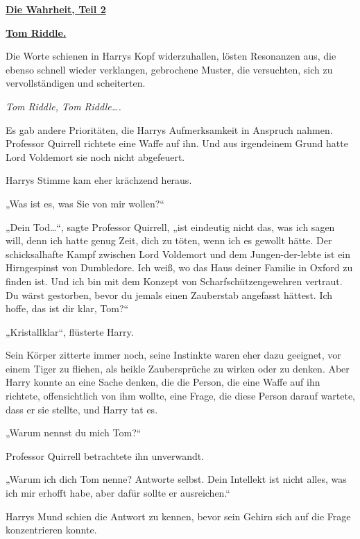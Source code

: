 

\hypertarget{die-wahrheit-teil-2}{%

\textbf{\uline{Die Wahrheit, Teil 2}}

\textbf{\uline{Tom Riddle.}}

Die Worte schienen in Harrys Kopf widerzuhallen, lösten Resonanzen aus, die ebenso schnell wieder verklangen, gebrochene Muster, die versuchten, sich zu vervollständigen und scheiterten.

\emph{Tom Riddle, Tom Riddle….}

Es gab andere Prioritäten, die Harrys Aufmerksamkeit in Anspruch nahmen. Professor Quirrell richtete eine Waffe auf ihn. Und aus irgendeinem Grund hatte Lord Voldemort sie noch nicht abgefeuert.

Harrys Stimme kam eher krächzend heraus.

„Was ist es, was Sie von mir wollen?“

„Dein Tod…“, sagte Professor Quirrell, „ist eindeutig nicht das, was ich sagen will, denn ich hatte genug Zeit, dich zu töten, wenn ich es gewollt hätte. Der schicksalhafte Kampf zwischen Lord Voldemort und dem Jungen-der-lebte ist ein Hirngespinst von Dumbledore. Ich weiß, wo das Haus deiner Familie in Oxford zu finden ist. Und ich bin mit dem Konzept von Scharfschützengewehren vertraut. Du wärst gestorben, bevor du jemals einen Zauberstab angefasst hättest. Ich hoffe, das ist dir klar, Tom?“

„Kristallklar“, flüsterte Harry.

Sein Körper zitterte immer noch, seine Instinkte waren eher dazu geeignet, vor einem Tiger zu fliehen, als heikle Zaubersprüche zu wirken oder zu denken. Aber Harry konnte an eine Sache denken, die die Person, die eine Waffe auf ihn richtete, offensichtlich von ihm wollte, eine Frage, die diese Person darauf wartete, dass er sie stellte, und Harry tat es.

„Warum nennst du mich Tom?“

Professor Quirrell betrachtete ihn unverwandt.

„Warum ich dich Tom nenne? Antworte selbst. Dein Intellekt ist nicht alles, was ich mir erhofft habe, aber dafür sollte er ausreichen.“

Harrys Mund schien die Antwort zu kennen, bevor sein Gehirn sich auf die Frage konzentrieren konnte.

}
